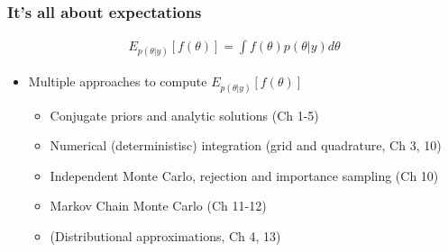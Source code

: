 \documentclass[10pt]{beamer}
\begin{document}
\begin{frame}


\frametitle{It's all about expectations}

   \begin{align*}
   E_{p(\theta|y)}[f(\theta)] = \int f(\theta) p(\theta|y) d\theta
   \end{align*}

  \begin{itemize}
  \item Multiple approaches to compute $E_{p(\theta|y)}[f(\theta)]$
  \begin{itemize}
  \item Conjugate priors and analytic solutions (Ch 1-5)
  \pause
  \item Numerical (deterministisc) integration (grid and quadrature, Ch 3, 10)
  \pause
  \item Independent Monte Carlo, rejection and importance sampling (Ch 10)
  \pause
  \item Markov Chain Monte Carlo (Ch 11-12)
  \pause
  \item (Distributional approximations, Ch 4, 13)
  \end{itemize}
  \end{itemize}

 \end{frame}
\end{document}
